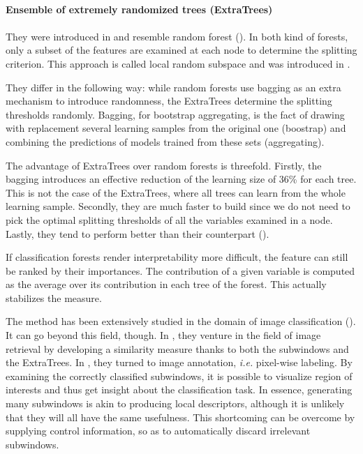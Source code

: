 \documentclass[a4paper]{report}
\begin{document}
\begin{leftbar}
	\paragraph{Ensemble of extremely randomized trees (ExtraTrees)}
	\paragraph{}
	They were introduced in \cite{extratrees} and resemble random forest (\cite{randomforests}). In both kind of forests, only a subset of the features are examined at each node to determine the splitting criterion. This approach is called local random subspace and was introduced in \cite{randomsubspace}. 
	\par
	They differ in the following way: while random forests use bagging as an extra mechanism to introduce randomness, the ExtraTrees determine the splitting thresholds randomly. Bagging, for bootstrap aggregating, is the fact of drawing with replacement several learning samples from the original one (boostrap) and combining the predictions of models trained from these sets (aggregating). 
	\par
	The advantage of ExtraTrees over random forests is threefold. Firstly, the bagging introduces an effective reduction of the learning size of 36\% for each tree. This is not the case of the ExtraTrees, where all trees can learn from the whole learning sample. Secondly, they are much faster to build since we do not need to pick the optimal splitting thresholds of all the variables examined in a node. Lastly, they tend to perform better than their counterpart (\cite{extratrees}).
	\par
	If classification forests render interpretability more difficult, the feature can still be ranked by their importances. The contribution of a given variable is computed as the average over its contribution in each tree of the forest.	This actually stabilizes the measure.
\end{leftbar}
The method has been extensively studied in the domain of image classification (\cite{base}). It can go beyond this field, though. In \cite{PixitImgRetrieval}, they venture in the field of image retrieval by developing a similarity measure thanks to both the subwindows and the ExtraTrees. In \cite{PixitLabeling}, they turned to image annotation, \textit{i.e.} pixel-wise labeling. By examining the correctly classified subwindows, it is possible to visualize region of interests and thus get insight about the classification task. In essence, generating many subwindows is akin to producing local descriptors, although it is unlikely that they will all have the same usefulness. This shortcoming can be overcome by supplying control information, so as to automatically discard irrelevant subwindows.
\end{document}
